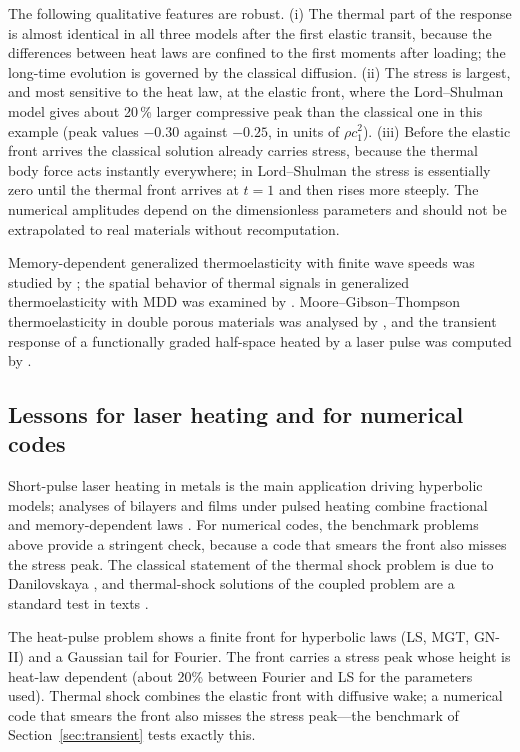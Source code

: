 The following qualitative features are robust. (i) The thermal part of the response is almost identical in all three models after the first elastic transit, because the differences between heat laws are confined to the first moments after loading; the long-time evolution is governed by the classical diffusion. (ii) The stress is largest, and most sensitive to the heat law, at the elastic front, where the Lord--Shulman model gives about 20\,\% larger compressive peak than the classical one in this example (peak values $-0.30$ against $-0.25$, in units of $\rho c_1^2$). (iii) Before the elastic front arrives the classical solution already carries stress, because the thermal body force acts instantly everywhere; in Lord--Shulman the stress is essentially zero until the thermal front arrives at $t=1$ and then rises more steeply. The numerical amplitudes depend on the dimensionless parameters and should not be extrapolated to real materials without recomputation.

Memory-dependent generalized thermoelasticity with finite wave speeds was studied by \citep{Sarkar2021}; the spatial behavior of thermal signals in generalized thermoelasticity with MDD was examined by \citep{Sarkar2020}. Moore--Gibson--Thompson thermoelasticity in double porous materials was analysed by \citep{Florea2021}, and the transient response of a functionally graded half-space heated by a laser pulse was computed by \citep{Li2020}.

\subsection{Lessons for laser heating and for numerical codes}
Short-pulse laser heating in metals is the main application driving hyperbolic models; analyses of bilayers and films under pulsed heating combine fractional and memory-dependent laws \citep{Li2019}. For numerical codes, the benchmark problems above provide a stringent check, because a code that smears the front also misses the stress peak. The classical statement of the thermal shock problem is due to Danilovskaya \citep{Danilovskaya1950}, and thermal-shock solutions of the coupled problem are a standard test in texts \citep{Boley1960,Nowacki1975,HetnarskiIgnaczak1999}.

\begin{summarybox}[Summary]
The heat-pulse problem shows a finite front for hyperbolic laws (LS, MGT, GN-II) and a Gaussian tail for Fourier. The front carries a stress peak whose height is heat-law dependent (about 20\% between Fourier and LS for the parameters used). Thermal shock combines the elastic front with diffusive wake; a numerical code that smears the front also misses the stress peak---the benchmark of Section~\ref{sec:transient} tests exactly this.
\end{summarybox}
